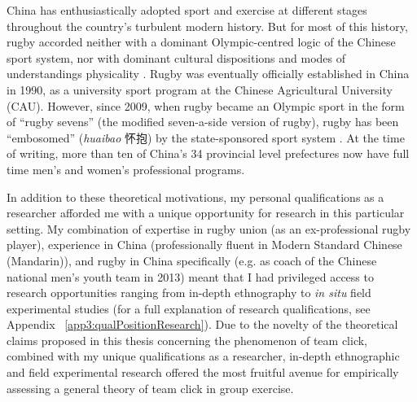 \begin{CJK}{UTF8}{gbsn}
China has enthusiastically adopted sport and exercise at different stages throughout the country's turbulent modern history.  But for most of this history, rugby accorded neither with a dominant Olympic-centred logic of the Chinese sport system, nor with dominant cultural dispositions and modes of understandings physicality \citep[which derived from hundreds of years of continuous history of Confucian and Daoist traditions of thought, see][]{Morris2004}.  Rugby was eventually officially established in China in 1990, as a university sport program at the Chinese Agricultural University (CAU).  However, since 2009, when rugby became an Olympic sport in the form of ``rugby sevens'' (the modified seven-a-side version of rugby), rugby has been ``embosomed'' (\textit{huaibao} 怀抱) by the state-sponsored sport system \citep{Xu2010}.  At the time of writing, more than ten of China's 34 provincial level prefectures now have full time men's and women's professional programs.







In addition to these theoretical motivations, my personal qualifications as a researcher afforded me with a unique opportunity for research in this particular setting.  My combination of expertise in rugby union (as an ex-professional rugby player), experience in China (professionally fluent in Modern Standard Chinese (Mandarin)), and rugby in China specifically (e.g. as coach of the Chinese national men’s youth team in 2013) meant that I had privileged access to research opportunities ranging from in-depth ethnography to \textit{in situ} field experimental studies (for a full explanation of research qualifications, see Appendix ~\ref{app3:qualPositionResearch}).  Due to the novelty of the theoretical claims proposed in this thesis concerning the phenomenon of team click, combined with my unique qualifications as a researcher, in-depth ethnographic and field experimental research offered the most fruitful avenue for empirically assessing a general theory of team click in group exercise.


\end{CJK}
